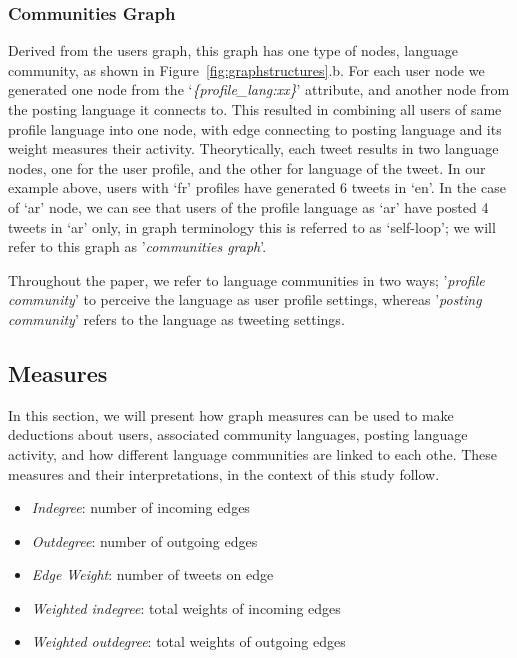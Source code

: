 \documentclass{llncs}
\begin{document}
\subsubsection{Communities Graph}\label{communitiesgraph}

Derived from the users graph, this graph has one type of nodes,
language community, as shown in Figure~\ref{fig:graphstructures}.b. 
For each user node we generated one node from the 
`{\emph{\{profile\_lang:xx\}}}' attribute, and another node from the 
posting language it connects to. This resulted in combining all users of same
profile language into one node, with edge connecting to posting language and
its weight measures their activity. Theorytically, each
tweet results in two language nodes, one for the user profile, and the
other for language of the tweet. In our example above, users with `fr'
profiles have generated 6 tweets in `en'. In the case of `ar' node, we
can see that users of the profile language as `ar' have posted 4
tweets in `ar' only, in graph terminology this is referred to as
`self-loop'; we will refer to this graph as '\emph{communities
graph}'. 

Throughout the paper, we refer to language communities in two ways;
'\emph{profile community}' to perceive the language as user profile settings, whereas 
'\emph{posting community}' refers to the language as tweeting settings.  

\subsection{Measures}
In this section, we will present how graph measures can be used to 
make deductions about users, associated community languages, posting language
activity, and how different language communities are linked to each othe. 
These measures and their interpretations, in the context of 
this study follow. 
\begin{itemize}
\item \emph{Indegree}: number of incoming edges
\item \emph{Outdegree}: number of outgoing edges
\item \emph{Edge Weight}: number of tweets on edge
\item \emph{Weighted indegree}: total weights of incoming edges
\item \emph{Weighted outdegree}: total weights of outgoing edges
\end{itemize}
\end{document}
